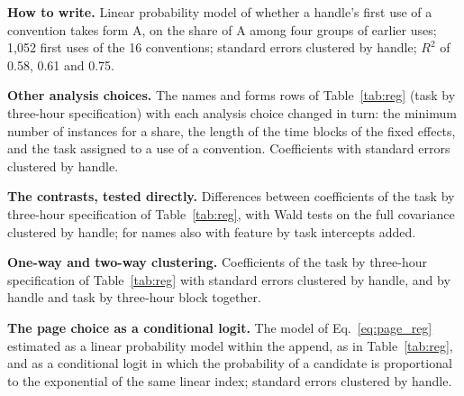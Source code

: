 \documentclass[10pt]{article}
\begin{document}
\begin{table}[htbp]\centering\small
\caption{\textbf{How to write.} Linear probability model of whether a handle's first use of a convention takes form A, on the share of A among four groups of earlier uses; 1,052 first uses of the 16 conventions; standard errors clustered by handle; $R^2$ of 0.58, 0.61 and 0.75.}\label{tab:reg_forms}

\end{table}

\begin{table}[htbp]\centering\scriptsize
\caption{\textbf{Other analysis choices.} The names and forms rows of Table~\ref{tab:reg} (task by three-hour specification) with each analysis choice changed in turn: the minimum number of instances for a share, the length of the time blocks of the fixed effects, and the task assigned to a use of a convention. Coefficients with standard errors clustered by handle.}\label{tab:choices}
\resizebox{\textwidth}{!}{}
\end{table}

\begin{table}[htbp]\centering\small
\caption{\textbf{The contrasts, tested directly.} Differences between coefficients of the task by three-hour specification of Table~\ref{tab:reg}, with Wald tests on the full covariance clustered by handle; for names also with feature by task intercepts added.}\label{tab:wald}

\end{table}

\begin{table}[htbp]\centering\small
\caption{\textbf{One-way and two-way clustering.} Coefficients of the task by three-hour specification of Table~\ref{tab:reg} with standard errors clustered by handle, and by handle and task by three-hour block together.}\label{tab:twoway}

\end{table}

\begin{table}[htbp]\centering\small
\caption{\textbf{The page choice as a conditional logit.} The model of Eq.~\eqref{eq:page_reg} estimated as a linear probability model within the append, as in Table~\ref{tab:reg}, and as a conditional logit in which the probability of a candidate is proportional to the exponential of the same linear index; standard errors clustered by handle.}\label{tab:clogit}

\end{table}
\end{document}
